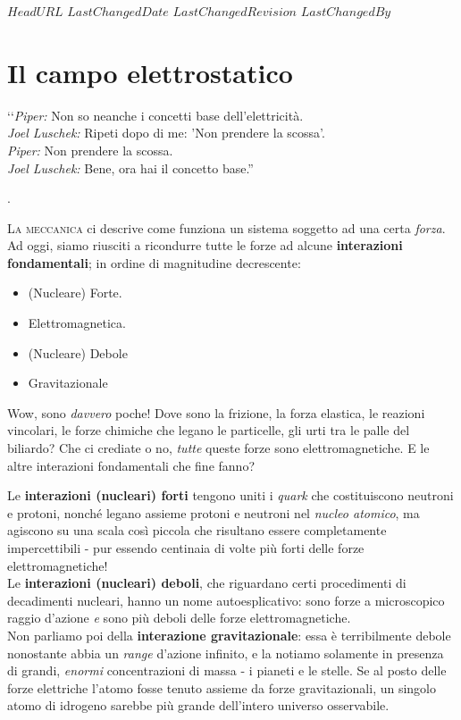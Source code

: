\svnidlong
{$HeadURL$}
{$LastChangedDate$}
{$LastChangedRevision$}
{$LastChangedBy$}

\chapter{Il campo elettrostatico}%

\begin{introduction}
	‘‘\emph{Piper:} Non so neanche i concetti base dell'elettricità.\\
	\emph{Joel Luschek:} Ripeti dopo di me: 'Non prendere la scossa'.\\
	\emph{Piper:} Non prendere la scossa.\\
	\emph{Joel Luschek:} Bene, ora hai il concetto base.''
\begin{flushright}
	.
\end{flushright}
\end{introduction}
\lettrine[findent=1pt, nindent=0pt]{L}{a meccanica} ci descrive come funziona un sistema soggetto ad una certa \textit{forza}. Ad oggi, siamo riusciti a ricondurre tutte le forze ad alcune \textbf{interazioni fondamentali}; in ordine di magnitudine decrescente:
 \begin{itemize}
 	\item (Nucleare) Forte.
 	\item Elettromagnetica.
 	\item (Nucleare) Debole
 	\item Gravitazionale
 \end{itemize}
 Wow, sono \textit{davvero} poche! Dove sono la frizione, la forza elastica, le reazioni vincolari, le forze chimiche che legano le particelle, gli urti tra le palle del biliardo? Che ci crediate o no, \textit{tutte} queste forze sono elettromagnetiche. E le altre interazioni fondamentali che fine fanno?

Le \textbf{interazioni (nucleari) forti} tengono uniti i \textit{quark} che costituiscono neutroni e protoni, nonché legano assieme protoni e neutroni nel \textit{nucleo atomico}, ma agiscono su una scala così piccola che risultano essere completamente impercettibili - pur essendo centinaia di volte più forti delle forze elettromagnetiche!\\
Le \textbf{interazioni (nucleari) deboli}, che riguardano certi procedimenti di decadimenti nucleari, hanno un nome autoesplicativo: sono forze a microscopico raggio d'azione \textit{e} sono più deboli delle forze elettromagnetiche.\\
Non parliamo poi della \textbf{interazione gravitazionale}: essa è terribilmente debole nonostante abbia un \textit{range} d'azione infinito, e la notiamo solamente in presenza di grandi, \textit{enormi} concentrazioni di massa - i pianeti e le stelle. Se al posto delle forze elettriche l'atomo fosse tenuto assieme da forze gravitazionali, un singolo atomo di idrogeno sarebbe più grande dell'intero universo osservabile.

